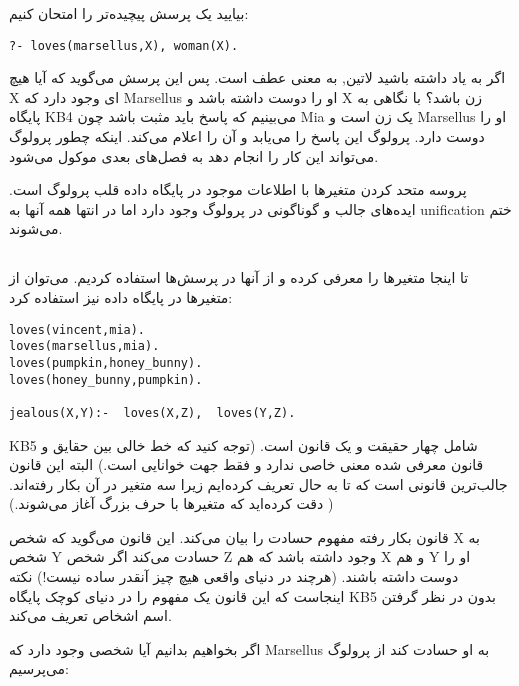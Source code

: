 بیایید یک پرسش پیچیده‌تر را امتحان کنیم:

\begin{latin}
\begin{lstlisting}
?- loves(marsellus,X), woman(X).
\end{lstlisting}
\end{latin}

اگر به یاد داشته باشید ‌لاتین{,} به معنی عطف است. پس این پرسش می‌گوید که آیا هیچ X ای وجود دارد که Marsellus او را دوست داشته باشد و X زن باشد؟ با نگاهی به پایگاه KB4 می‌بینیم که پاسخ باید مثبت باشد چون Mia یک زن است و Marsellus او را دوست دارد. پرولوگ این پاسخ را می‌یابد و آن را اعلام می‌کند. اینکه چطور پرولوگ می‌تواند این کار را انجام دهد به فصل‌های بعدی موکول می‌شود.

پروسه متحد کردن متغیرها با اطلاعات موجود در پایگاه داده قلب پرولوگ است. ایده‌های جالب و گوناگونی در پرولوگ وجود دارد اما در انتها همه آنها به unification ختم می‌شوند.

\subsection{}
تا اینجا متغیرها را معرفی کرده و از آنها در پرسش‌ها استفاده کردیم. می‌توان از متغیرها در پایگاه داده نیز استفاده کرد:

\begin{latin}
\begin{lstlisting}[title=KB5]
loves(vincent,mia). 
loves(marsellus,mia). 
loves(pumpkin,honey_bunny). 
loves(honey_bunny,pumpkin). 
    
jealous(X,Y):-  loves(X,Z),  loves(Y,Z).
\end{lstlisting}
\end{latin}

KB5 شامل چهار حقیقت و یک قانون است. (توجه کنید که خط خالی بین حقایق و قانون معرفی شده معنی خاصی ندارد و فقط جهت خوانایی است.) البته این قانون جالب‌ترین قانونی است که تا به حال تعریف کرده‌ایم زیرا سه متغیر در آن بکار رفته‌اند. ( دقت کرده‌اید که متغیرها با حرف بزرگ آغاز می‌شوند.) 

قانون بکار رفته مفهوم حسادت را بیان می‌کند. این قانون می‌گوید که شخص X به شخص Y حسادت می‌کند اگر شخص Z وجود داشته باشد که هم X و هم Y او را دوست داشته باشند. (هرچند در دنیای واقعی هیچ چیز آنقدر ساده نیست!) نکته اینجاست که این قانون یک مفهوم را در دنیای کوچک پایگاه KB5 بدون در نظر گرفتن اسم اشخاص تعریف می‌کند.

اگر بخواهیم بدانیم آیا شخصی وجود دارد که Marsellus به او حسادت کند از پرولوگ می‌پرسیم:

